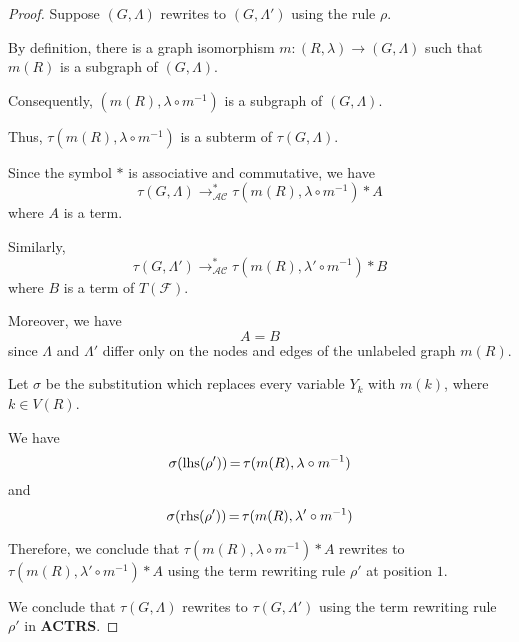 \begin{proof}
    Suppose $(G, \Lambda)$ rewrites to $(G, \Lambda')$ using the rule $\rho$. 
    
    By definition, there is a graph isomorphism $m: (R,\lambda) \mathop{\to} (G,\Lambda)$ such that $m(R)$ is a subgraph of $(G,\Lambda)$.
    
    Consequently, $(m(R), \lambda \circ m^{-1})$ is a subgraph of $(G,\Lambda)$. 
    
    Thus, $\tau(m(R), \lambda \circ m^{-1})$ is a subterm of $\tau(G,\Lambda)$. 
    
    Since the symbol $*$ is associative and commutative, we have $$\tau(G,\Lambda) \mathop{\to} _\mathcal{AC}^* \tau(m(R),\lambda \circ m^{-1}) * A$$
    where $A$ is a term. 
    
    Similarly, 
    $$\tau(G,\Lambda')\to_\mathcal{AC}^* \tau(m(R), \lambda' \circ m^{-1}) * B$$
    where $B$ is a term of $T(\mathcal{F})$. 

    Moreover, we have $$A=B$$
    since $\Lambda$ and $\Lambda'$ differ only on the nodes and edges of the unlabeled graph $m(R)$.

    Let $\sigma$ be the substitution which replaces every variable $Y_k$ with $m(k)$, where $k \mathop{\in} V(R)$.
    
    We have 
    $$ \sigma(\operatorname{lhs}(\rho')) \mathop{=} \tau(m(R), \lambda \circ m^{-1})$$ 
    and  
    $$\sigma(\operatorname{rhs}(\rho')) \mathop{=} \tau(m(R), \lambda' \circ m^{-1})$$

    Therefore, we conclude that $\tau(m(R),\lambda \circ m^{-1}) * A$ rewrites to $\tau(m(R),\lambda' \circ m^{-1}) * A$ using the term rewriting rule $\rho'$ at position $1$.

    We conclude that $\tau(G,\Lambda)$ rewrites to $\tau(G,\Lambda')$ using the term rewriting rule $\rho'$ in \textbf{ACTRS}.
\end{proof}





